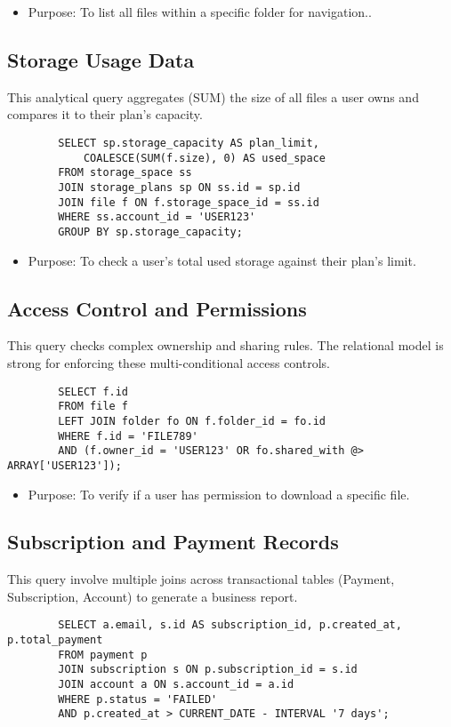     \begin{itemize}
        \item Purpose: To list all files within a specific folder for navigation..
    \end{itemize}

\subsection{Storage Usage Data}
    This analytical query aggregates (SUM) the size of all files a user owns and compares it to their plan's capacity.
    \begin{verbatim}
        SELECT sp.storage_capacity AS plan_limit,
            COALESCE(SUM(f.size), 0) AS used_space
        FROM storage_space ss
        JOIN storage_plans sp ON ss.id = sp.id
        JOIN file f ON f.storage_space_id = ss.id
        WHERE ss.account_id = 'USER123'
        GROUP BY sp.storage_capacity;
    \end{verbatim}

    \begin{itemize}
        \item Purpose: To check a user's total used storage against their plan's limit.
    \end{itemize}

\subsection{Access Control and Permissions}
    This query checks complex ownership and sharing rules. The relational model is strong for enforcing these multi-conditional access controls.
    \begin{verbatim}
        SELECT f.id
        FROM file f
        LEFT JOIN folder fo ON f.folder_id = fo.id
        WHERE f.id = 'FILE789'
        AND (f.owner_id = 'USER123' OR fo.shared_with @> ARRAY['USER123']);
    \end{verbatim}

    \begin{itemize}
        \item Purpose: To verify if a user has permission to download a specific file.
    \end{itemize}

\subsection{Subscription and Payment Records}
    This query involve multiple joins across transactional tables (Payment, Subscription, Account) to generate a business report.
    \begin{verbatim}
        SELECT a.email, s.id AS subscription_id, p.created_at, p.total_payment
        FROM payment p
        JOIN subscription s ON p.subscription_id = s.id
        JOIN account a ON s.account_id = a.id
        WHERE p.status = 'FAILED'
        AND p.created_at > CURRENT_DATE - INTERVAL '7 days';
    \end{verbatim}

